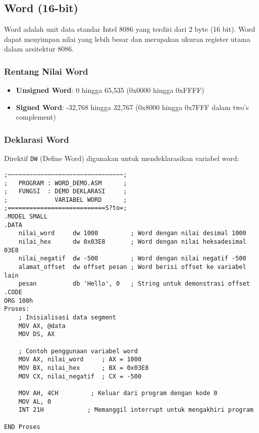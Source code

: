 \documentclass[../main.tex]{subfiles}
\begin{document}
\subsection{Word (16-bit)}
Word adalah unit data standar Intel 8086 yang terdiri dari 2 byte (16 bit). Word dapat menyimpan nilai yang lebih besar dan merupakan ukuran register utama dalam arsitektur 8086.

\subsubsection{Rentang Nilai Word}
\begin{itemize}
    \item \textbf{Unsigned Word}: 0 hingga 65,535 (0x0000 hingga 0xFFFF)
    \item \textbf{Signed Word}: -32,768 hingga 32,767 (0x8000 hingga 0x7FFF dalam two's complement)
\end{itemize}

\subsubsection{Deklarasi Word}
Direktif \texttt{DW} (Define Word) digunakan untuk mendeklarasikan variabel word:

\begin{lstlisting}[language={[x86masm]Assembler}, caption=Deklarasi Variabel Word, label={lst:word-declaration}]
;~~~~~~~~~~~~~~~~~~~~~~~~~~~~~~~~;
;   PROGRAM : WORD_DEMO.ASM      ;
;   FUNGSI  : DEMO DEKLARASI     ;
;             VARIABEL WORD      ;
;===========================S?to=;
.MODEL SMALL
.DATA
    nilai_word     dw 1000         ; Word dengan nilai desimal 1000
    nilai_hex      dw 0x03E8       ; Word dengan nilai heksadesimal 03E8
    nilai_negatif  dw -500         ; Word dengan nilai negatif -500
    alamat_offset  dw offset pesan ; Word berisi offset ke variabel lain
    pesan          db 'Hello', 0   ; String untuk demonstrasi offset
.CODE
ORG 100h
Proses:
    ; Inisialisasi data segment
    MOV AX, @data
    MOV DS, AX
    
    ; Contoh penggunaan variabel word
    MOV AX, nilai_word     ; AX = 1000
    MOV BX, nilai_hex      ; BX = 0x03E8
    MOV CX, nilai_negatif  ; CX = -500
    
    MOV AH, 4CH         ; Keluar dari program dengan kode 0
    MOV AL, 0
    INT 21H            ; Memanggil interrupt untuk mengakhiri program

END Proses
\end{lstlisting}
\end{document}
